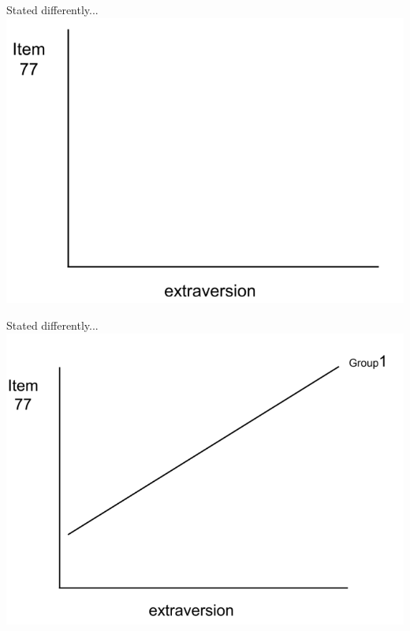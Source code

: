 \documentclass[10pt]{beamer}\usepackage[]{graphicx}\usepackage[]{xcolor}
\begin{document}
\begin{frame}{Stated differently...}
    \includegraphics[height=0.8\textheight,keepaspectratio]{images/slide106.png}
\end{frame}

\begin{frame}{Stated differently...}
    \includegraphics[height=0.8\textheight,keepaspectratio]{images/slide107.png}
\end{frame}
\end{document}
